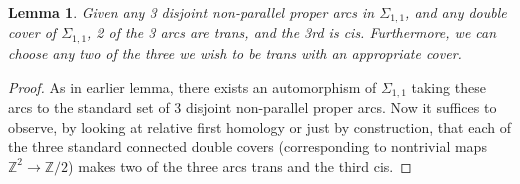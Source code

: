 \documentclass[12pt]{amsart}
\newtheorem{lemma}[theorem]{Lemma}
\theoremstyle{definition}
\theoremstyle{remark}
\newcommand{\Si}{\Sigma}
\begin{document}
\begin{lemma}

Given any 3 disjoint non-parallel proper arcs in $\Si_{1,1}$, and any double
cover of $\Si_{1,1}$, 2 of the 3 arcs are trans, and the 3rd is cis.
Furthermore, we can choose any two of the three we wish to be trans with an
appropriate cover.

\end{lemma}
\begin{proof}

As in earlier lemma, there exists an automorphism of $\Si_{1,1}$ taking these
arcs to the standard set of 3 disjoint non-parallel proper arcs.  Now it
suffices to observe, by looking at relative first homology or just by
construction, that each of the three standard connected double covers
(corresponding to nontrivial maps $\mathbb{Z}^2 \to \mathbb{Z}/2$) makes two of
the three arcs trans and the third cis.

\end{proof}
\end{document}
